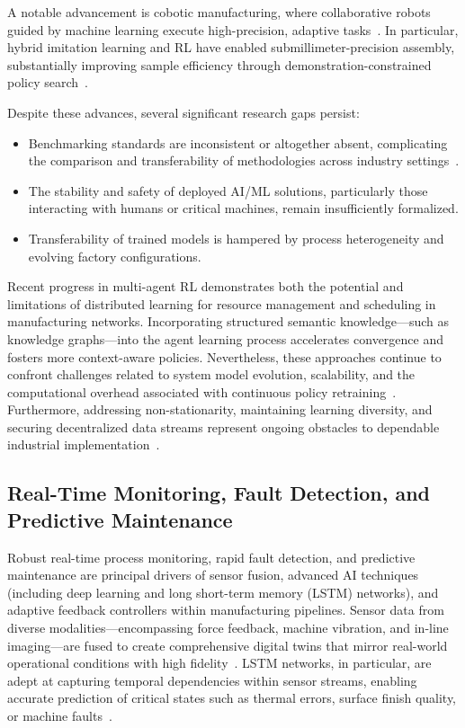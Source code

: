 A notable advancement is cobotic manufacturing, where collaborative robots guided by machine learning execute high-precision, adaptive tasks~\cite{ref42,ref44,ref45}. In particular, hybrid imitation learning and RL have enabled submillimeter-precision assembly, substantially improving sample efficiency through demonstration-constrained policy search~\cite{ref44}.

Despite these advances, several significant research gaps persist:
\begin{itemize}
    \item Benchmarking standards are inconsistent or altogether absent, complicating the comparison and transferability of methodologies across industry settings~\cite{ref56}.
    \item The stability and safety of deployed AI/ML solutions, particularly those interacting with humans or critical machines, remain insufficiently formalized.
    \item Transferability of trained models is hampered by process heterogeneity and evolving factory configurations.
\end{itemize}

Recent progress in multi-agent RL demonstrates both the potential and limitations of distributed learning for resource management and scheduling in manufacturing networks. Incorporating structured semantic knowledge—such as knowledge graphs—into the agent learning process accelerates convergence and fosters more context-aware policies. Nevertheless, these approaches continue to confront challenges related to system model evolution, scalability, and the computational overhead associated with continuous policy retraining~\cite{ref13,ref30}. Furthermore, addressing non-stationarity, maintaining learning diversity, and securing decentralized data streams represent ongoing obstacles to dependable industrial implementation~\cite{ref13,ref56}.

\subsection{Real-Time Monitoring, Fault Detection, and Predictive Maintenance}

Robust real-time process monitoring, rapid fault detection, and predictive maintenance are principal drivers of sensor fusion, advanced AI techniques (including deep learning and long short-term memory (LSTM) networks), and adaptive feedback controllers within manufacturing pipelines. Sensor data from diverse modalities—encompassing force feedback, machine vibration, and in-line imaging—are fused to create comprehensive digital twins that mirror real-world operational conditions with high fidelity~\cite{ref2, ref5, ref6, ref7, ref15, ref20, ref27, ref44, ref47, ref48, ref58, ref59}. LSTM networks, in particular, are adept at capturing temporal dependencies within sensor streams, enabling accurate prediction of critical states such as thermal errors, surface finish quality, or machine faults~\cite{ref5, ref15, ref48, ref59}.

